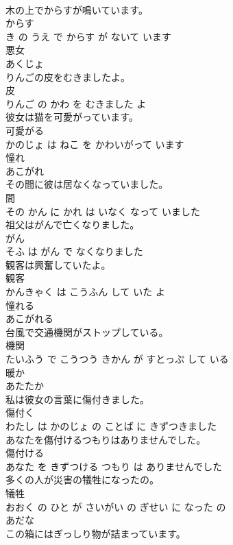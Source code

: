 \documentclass[8pt]{extreport}
\begin{document}
\begin{CJK}{UTF8}{min}
\\	木の上でからすが鳴いています。	
\\	からす 
\\	き の うえ で からす が ないて います			
\\	悪女	
\\	あくじょ		
\\	りんごの皮をむきましたよ。	
\\	皮 
\\	りんご の かわ を むきました よ			
\\	彼女は猫を可愛がっています。	
\\	可愛がる 
\\	かのじょ は ねこ を かわいがって います			
\\	憧れ	
\\	あこがれ		
\\	その間に彼は居なくなっていました。	
\\	間 
\\	その かん に かれ は いなく なって いました			
\\	祖父はがんで亡くなりました。	
\\	がん 
\\	そふ は がん で なくなりました			
\\	観客は興奮していたよ。	
\\	観客 
\\	かんきゃく は こうふん して いた よ			
\\	憧れる	
\\	あこがれる		
\\	台風で交通機関がストップしている。	
\\	機関 
\\	たいふう で こうつう きかん が すとっぷ して いる			
\\	暖か	
\\	あたたか		
\\	私は彼女の言葉に傷付きました。	
\\	傷付く 
\\	わたし は かのじょ の ことば に きずつきました			
\\	あなたを傷付けるつもりはありませんでした。	
\\	傷付ける 
\\	あなた を きずつける つもり は ありませんでした			
\\	多くの人が災害の犠牲になったの。	
\\	犠牲 
\\	おおく の ひと が さいがい の ぎせい に なった の			
\\	あだな	
\\	この箱にはぎっしり物が詰まっています。	

\end{CJK}
\end{document}
